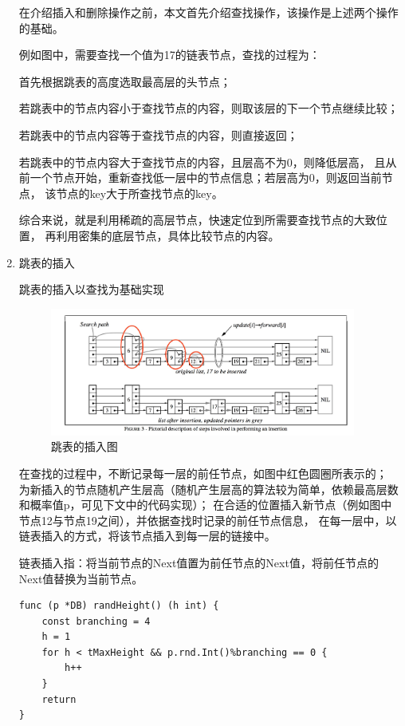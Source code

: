 \begin{enumerate}
		在介绍插入和删除操作之前，本文首先介绍查找操作，该操作是上述两个操作的基础。

例如图中，需要查找一个值为17的链表节点，查找的过程为：

首先根据跳表的高度选取最高层的头节点；

若跳表中的节点内容小于查找节点的内容，则取该层的下一个节点继续比较；

若跳表中的节点内容等于查找节点的内容，则直接返回；

若跳表中的节点内容大于查找节点的内容，且层高不为0，则降低层高，
且从前一个节点开始，重新查找低一层中的节点信息；若层高为0，则返回当前节点，
该节点的key大于所查找节点的key。

综合来说，就是利用稀疏的高层节点，快速定位到所需要查找节点的大致位置，
再利用密集的底层节点，具体比较节点的内容。
		

		\item 跳表的插入
		
		跳表的插入以查找为基础实现

		\begin{figure}[H]
			\centering
			\includegraphics[width=0.95\textwidth]{images/skiplist_insert}
			\caption{跳表的插入图}
			\label{skiplist_insert}
		\end{figure}

		在查找的过程中，不断记录每一层的前任节点，如图中红色圆圈所表示的；
		为新插入的节点随机产生层高（随机产生层高的算法较为简单，依赖最高层数和概率值p，可见下文中的代码实现）；
		在合适的位置插入新节点（例如图中节点12与节点19之间），并依据查找时记录的前任节点信息，
		在每一层中，以链表插入的方式，将该节点插入到每一层的链接中。


		链表插入指：将当前节点的Next值置为前任节点的Next值，将前任节点的Next值替换为当前节点。

		\begin{lstlisting}[caption=skiplistRandHeight , label=code_radds_storage_skiplist_randHeight]
func (p *DB) randHeight() (h int) {
	const branching = 4
	h = 1
	for h < tMaxHeight && p.rnd.Int()%branching == 0 {
		h++
	}
	return
}	
		\end{lstlisting}


\end{enumerate}
